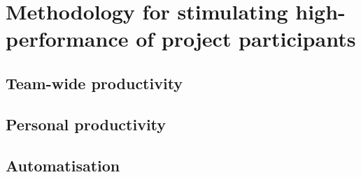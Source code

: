 \chapter{Methodology for stimulating high-performance of project participants}

\section{Team-wide productivity}

\section{Personal productivity}

\section{Automatisation}